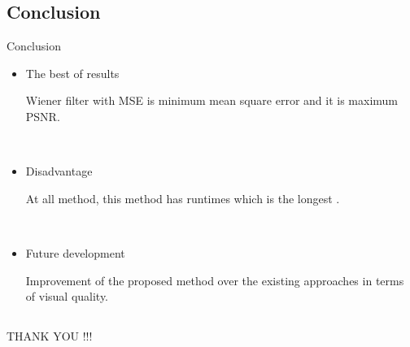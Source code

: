 \documentclass{beamer}
\begin{document}
\subsection{Conclusion}
\begin{frame}{Conclusion}
\begin{center}
\begin{itemize}
	\item The best of results
	
	 Wiener filter with  MSE is minimum mean square error and it is maximum PSNR.
	
	\ 
	
	\item  Disadvantage 
	
	At all method, this method has runtimes which is the longest .

	
	\
    
    \item Future development
     
      Improvement of the proposed method over the existing approaches in terms of visual quality.
\end{itemize}
\end{center}
 

\end{frame}



\subsection{}
\begin{frame}{}

\begin{center}
	\begin{LARGE}
		THANK YOU !!!
	\end{LARGE} 
\end{center}
\end{frame}
\end{document}
